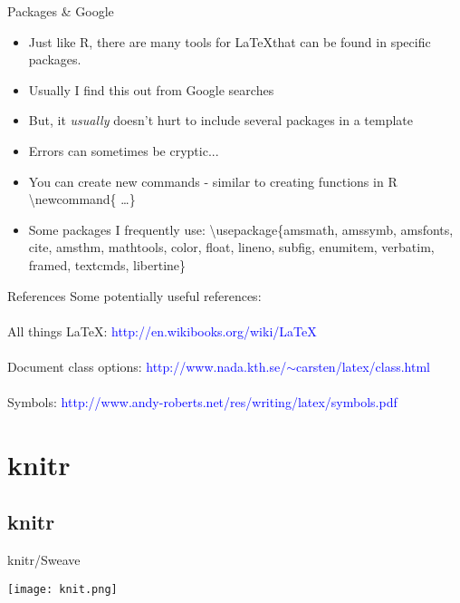 \documentclass[xcolor=dvipsnames]{beamer}
\begin{document}
\begin{frame}{\LARGE{Packages \& Google}}
\begin{itemize}
\item Just like R, there are many tools for \LaTeX that can be found in specific packages.
\item Usually I find this out from Google searches
\item But, it \textit{usually} doesn't hurt to include several packages in a template
\item Errors can sometimes be cryptic...
\item You can create new commands - similar to creating functions in R \textbackslash newcommand\{ \dots\}
\item Some packages I frequently use: \textbackslash usepackage\{amsmath, amssymb, amsfonts, cite, amsthm, mathtools, color, float, lineno, subfig, enumitem, verbatim, framed, textcmds, libertine\}
\end{itemize}
\end{frame}

\begin{frame}{\LARGE{References}}
Some potentially useful references:\\~\\
All things \LaTeX: 
\textcolor{blue}{http://en.wikibooks.org/wiki/LaTeX}~\\~\\ 


Document class options: \textcolor{blue}{http://www.nada.kth.se/$\sim$carsten/latex/class.html}~\\~\\

Symbols: 
\textcolor{blue}{http://www.andy-roberts.net/res/writing/latex/symbols.pdf}
\end{frame}

\section{knitr}
\subsection{knitr}

\begin{frame}{knitr/Sweave}
\begin{center}
\texttt{[image: knit.png]}
\end{center}
\end{frame}
\end{document}

